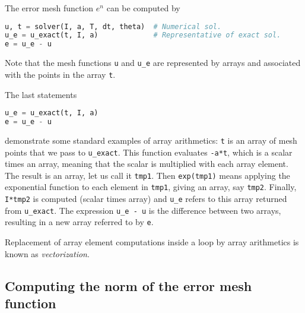 \documentclass[graybox,sectrefs,envcountresetchap,open=right,final]{svmonodo}
\newenvironment{notice_mdfboxadmon}[1][]{
\begin{notice_mdfboxmdframed}[frametitle=#1]
}
{
\end{notice_mdfboxmdframed}
}
\begin{document}
The error mesh function $e^n$ can be computed by





\begin{lstlisting}[language=python,style=blue1_bluegreen]
u, t = solver(I, a, T, dt, theta)  # Numerical sol.
u_e = u_exact(t, I, a)             # Representative of exact sol.
e = u_e - u

\end{lstlisting}

Note that the mesh functions \texttt{u} and \Verb!u_e! are represented by arrays
and associated with the points in the array \texttt{t}.

  


\begin{notice_mdfboxadmon}
The last statements




\begin{lstlisting}[language=python,style=blue1_bluegreen]
u_e = u_exact(t, I, a)
e = u_e - u

\end{lstlisting}

demonstrate some standard examples of array arithmetics: \texttt{t} is an
array of mesh points that we pass to \Verb!u_exact!. This function
evaluates \texttt{-a*t}, which is a scalar times an array, meaning that
the scalar is multiplied with each array element.
The result is an array, let us call it \texttt{tmp1}. Then
\texttt{exp(tmp1)} means applying the exponential function to each element in
\texttt{tmp1}, giving an array, say \texttt{tmp2}. Finally, \texttt{I*tmp2} is computed
(scalar times array) and \Verb!u_e! refers to this array returned from
\Verb!u_exact!. The expression \Verb!u_e - u! is the difference between
two arrays, resulting in a new array referred to by \texttt{e}.

Replacement of array element computations inside a loop by array
arithmetics is known as \emph{vectorization}.
\end{notice_mdfboxadmon} %



\subsection{Computing the norm of the error mesh function}
\label{decay:computing:error:norm}
\end{document}
